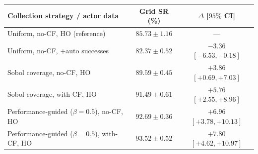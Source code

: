 \begin{tabular}{lcc}
\hline
Collection strategy / actor data & Grid SR (\%) & $\Delta$ [$95\%$ CI] \\
\hline
Uniform, no-CF, HO (reference) & $85.73 \pm 1.16$ & --- \\
Uniform, no-CF, $+$auto successes & $82.37 \pm 0.52$ & $-3.36$ $[-6.53, -0.18]$ \\
Sobol coverage, no-CF, HO & $89.59 \pm 0.45$ & $+3.86$ $[+0.69, +7.03]$ \\
Sobol coverage, with-CF, HO & $91.49 \pm 0.61$ & $+5.76$ $[+2.55, +8.96]$ \\
Performance-guided ($\beta{=}0.5$), no-CF, HO & $92.69 \pm 0.36$ & $+6.96$ $[+3.78, +10.13]$ \\
Performance-guided ($\beta{=}0.5$), with-CF, HO & $93.52 \pm 0.52$ & $+7.80$ $[+4.62, +10.97]$ \\
\hline
\end{tabular}
